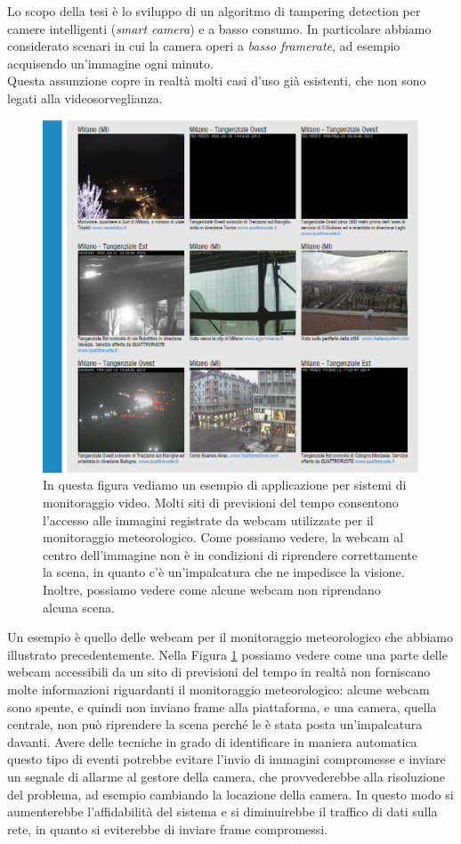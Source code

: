 Lo scopo della tesi \`e lo sviluppo di un algoritmo di tampering detection per camere intelligenti (\textit{smart camera}) e a basso consumo.
In particolare abbiamo considerato scenari in cui la camera operi a \textit{basso framerate}, ad esempio acquisendo un'immagine ogni minuto.\\
Questa assunzione copre in realt\`a molti casi d'uso gi\`a esistenti, che non sono legati alla videosorveglianza.
\begin{figure}[t]
	\centering
	\includegraphics[width=12cm]{pictures/ilMeteo}
	\caption[Webcam per il monitoraggio meteorologico]{In questa figura vediamo un esempio di applicazione per sistemi di monitoraggio video. Molti siti di previsioni del tempo consentono l'accesso alle immagini registrate da webcam utilizzate per il monitoraggio meteorologico. Come possiamo vedere, la webcam al centro dell'immagine non \`e in condizioni di riprendere correttamente la scena, in quanto c'\`e un'impalcatura che ne impedisce la visione. Inoltre, possiamo vedere come alcune webcam non riprendano alcuna scena.}
	\label{fig:ilMeteo}
\end{figure}
Un esempio \`e quello delle webcam per il monitoraggio meteorologico che abbiamo illustrato precedentemente.
Nella Figura \ref{fig:ilMeteo} possiamo vedere come una parte delle webcam accessibili da un sito di previsioni del tempo in realt\`a non forniscano molte informazioni riguardanti il monitoraggio meteorologico:
alcune webcam sono spente, e quindi non inviano frame alla piattaforma, e una camera, quella centrale, non pu\`o riprendere la scena perch\'e le \`e stata posta un'impalcatura davanti.
Avere delle tecniche in grado di identificare in maniera automatica questo tipo di eventi potrebbe evitare l'invio di immagini compromesse e inviare un segnale di allarme al gestore della camera, che provvederebbe alla risoluzione del problema, ad esempio cambiando la locazione della camera.
In questo modo si aumenterebbe l'affidabilit\`a del sistema e si diminuirebbe il traffico di dati sulla rete, in quanto si eviterebbe di inviare frame compromessi.\\

